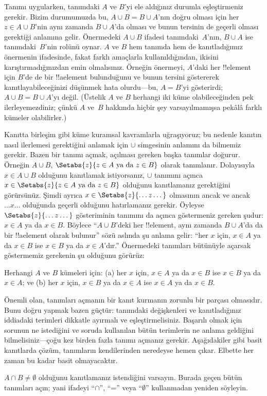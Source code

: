Tanımı uygularken, tanımdaki $A$ ve $B$'yi ele aldığınız durumla
eşleştirmeniz gerekir. Bizim durumumuzda bu, $A \cup B = B \cup A$'nın
doğru olması için her $z \in A \cup B$'nin aynı zamanda $B \cup A$'da
olması ve bunun tersinin de geçerli olması gerektiği anlamına gelir.
Önermedeki $A \cup B$ ifadesi tanımdaki~$A$'nın, $B \cup A$ ise
tanımdaki~$B$'nin rolünü oynar. $A$ ve $B$ hem tanımda hem de
kanıtladığımız önermenin ifadesinde, fakat farklı amaçlarla
kullanıldığından, ikisini karıştırmadığınızdan emin olmalısınız.
Örneğin önermeyi, $A$'daki her !!{element} için $B$'de de bir
!!a{element} bulunduğunu ve bunun tersini göstererek kanıtlayabileceğinizi
düşünmek hata olurdu---bu, $A = B$'yi gösterirdi; $A \cup B = B \cup A$'yı
değil. (Üstelik $A$ ve $B$ herhangi iki küme olabileceğinden pek
ilerleyemezdiniz; çünkü $A$ ve~$B$ hakkında hiçbir şey varsayılmamışsa
pekâlâ farklı kümeler olabilirler.)

Kanıtta birleşim gibi küme kuramsal kavramlarla uğraşıyoruz; bu nedenle
kanıtın nasıl ilerlemesi gerektiğini anlamak için $\cup$ simgesinin
anlamını da bilmemiz gerekir. Bazen bir tanımı açmak, açılması gereken
başka tanımlar doğurur. Örneğin $A \cup B$, $\Setabs{z}{z \in A
  \text{ ya da } z \in B}$ olarak tanımlanır. Dolayısıyla $x \in A \cup
B$ olduğunu kanıtlamak istiyorsanız, $\cup$ tanımını açınca $x \in
\Setabs{z}{z \in A \text{ ya da } z \in B}$ olduğunu kanıtlamanız
gerektiğini görürsünüz. Şimdi ayrıca $x \in
\Setabs{z}{\dots z\dots}$ olmasının ancak ve ancak $\dots x\dots$
olduğunda geçerli olduğunu hatırlamanız gerekir. Öyleyse
$\Setabs{z}{\dots z \dots}$ gösteriminin tanımını da açınca göstermeniz
gereken şudur: $x \in A$ ya da $x \in B$. Böylece ``$A \cup B$'deki her
!!{element}, aynı zamanda $B \cup A$'da da bir !!a{element} olarak bulunur'' sözü
aslında şu anlama gelir: ``her $x$ için, $x \in A$ ya da $x \in B$ ise
$x \in B$ ya da $x \in A$'dır.'' Önermedeki tanımları bütünüyle
açarsak göstermemiz gerekenin şu olduğunu görürüz:

\begin{prop}
Herhangi $A$ ve $B$ kümeleri için: (a) her $x$ için, $x \in A$ ya da
$x \in B$ ise $x \in B$ ya da $x \in A$; ve (b) her $x$ için, $x \in
B$ ya da $x \in A$ ise $x \in A$ ya da $x \in B$.
\end{prop}

Önemli olan, tanımları açmanın bir kanıt kurmanın zorunlu bir parçası
olmasıdır. Bunu doğru yapmak bazen güçtür: tanımdaki değişkenleri ve
kanıtladığınız iddiadaki terimleri dikkatle ayırmalı ve eşleştirmelisiniz.
Başarılı olmak için sorunun ne istediğini ve soruda kullanılan bütün
terimlerin ne anlama geldiğini bilmelisiniz---çoğu kez birden fazla
tanımı açmanız gerekir. Aşağıdakiler gibi basit kanıtlarda çözüm,
tanımların kendilerinden neredeyse hemen çıkar. Elbette her zaman bu
kadar basit olmayacaktır.

\begin{prob}
$A \cap B \neq \emptyset$ olduğunu kanıtlamanız istendiğini varsayın.
Burada geçen bütün tanımları açın; yani ifadeyi ``$\cap$'', ``='' veya
``$\emptyset$'' kullanmadan yeniden söyleyin.
\end{prob}

